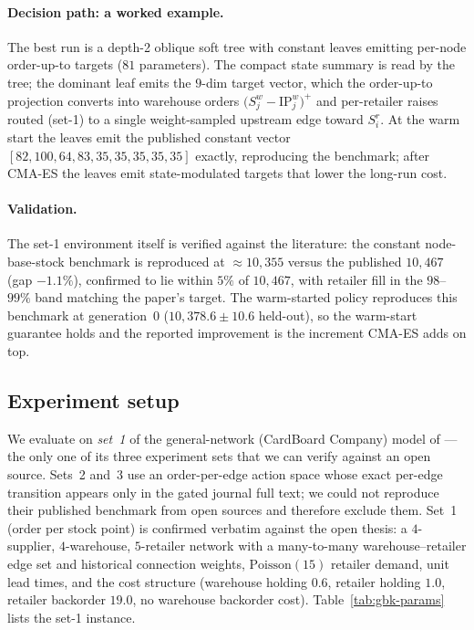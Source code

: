 \documentclass[11pt]{article}
\begin{document}
\paragraph{Decision path: a worked example.}
The best run is a depth-2 oblique soft tree with constant leaves emitting per-node order-up-to targets
($81$ parameters). The compact state summary is read by the tree; the dominant leaf emits the $9$-dim
target vector, which the order-up-to projection converts into warehouse orders
$\big(S^w_j-\mathrm{IP}^w_j\big)^+$ and per-retailer raises routed (set-1) to a single weight-sampled
upstream edge toward $S^r_i$. At the warm start the leaves emit the published constant vector
$[82,100,64,83,35,35,35,35,35]$ exactly, reproducing the benchmark; after CMA-ES the leaves emit
state-modulated targets that lower the long-run cost.

\paragraph{Validation.}
The set-1 environment itself is verified against the literature: the constant node-base-stock
benchmark is reproduced at $\approx 10{,}355$ versus the published $10{,}467$ (gap $-1.1\%$), confirmed
to lie within $5\%$ of $10{,}467$, with retailer fill in the $98$--$99\%$ band matching the paper's target.
The warm-started policy reproduces this benchmark at generation~0 ($10{,}378.6\pm10.6$ held-out), so
the warm-start guarantee holds and the reported improvement is the increment CMA-ES adds on top.

\subsection{Experiment setup}
\label{sec:gbk-setup}

We evaluate on \emph{set~1} of the general-network (CardBoard Company) model of
\citet{geevers2024cardboard} --- the only one of its three experiment sets that we can verify against
an open source. Sets~2 and~3 use an order-per-edge action space whose exact per-edge transition
appears only in the gated journal full text; we could not reproduce their published benchmark from
open sources and therefore exclude them. Set~1 (order per stock point) is confirmed verbatim against
the open thesis: a $4$-supplier, $4$-warehouse, $5$-retailer network with a many-to-many
warehouse--retailer edge set and historical connection weights, $\mathrm{Poisson}(15)$ retailer
demand, unit lead times, and the \citet{kunnumkal2011} cost structure (warehouse holding $0.6$,
retailer holding $1.0$, retailer backorder $19.0$, no warehouse backorder cost).
Table~\ref{tab:gbk-params} lists the set-1 instance.
\end{document}
